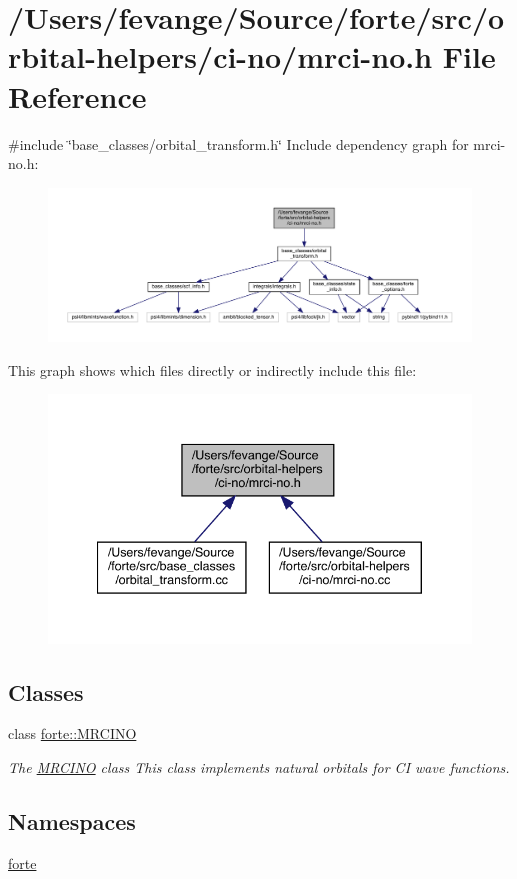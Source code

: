 \hypertarget{mrci-no_8h}{}\section{/\+Users/fevange/\+Source/forte/src/orbital-\/helpers/ci-\/no/mrci-\/no.h File Reference}
\label{mrci-no_8h}
{\ttfamily \#include \char`\"{}base\+\_\+classes/orbital\+\_\+transform.\+h\char`\"{}}\newline
Include dependency graph for mrci-\/no.h\+:
\nopagebreak
\begin{figure}[H]
\begin{center}
\leavevmode
\includegraphics[width=350pt]{mrci-no_8h__incl}
\end{center}
\end{figure}
This graph shows which files directly or indirectly include this file\+:
\nopagebreak
\begin{figure}[H]
\begin{center}
\leavevmode
\includegraphics[width=340pt]{mrci-no_8h__dep__incl}
\end{center}
\end{figure}
\subsection*{Classes}
\begin{DoxyCompactItemize}
\item 
class \mbox{\hyperlink{classforte_1_1_m_r_c_i_n_o}{forte\+::\+M\+R\+C\+I\+NO}}
\begin{DoxyCompactList}\small\item\em The \mbox{\hyperlink{classforte_1_1_m_r_c_i_n_o}{M\+R\+C\+I\+NO}} class This class implements natural orbitals for CI wave functions. \end{DoxyCompactList}\end{DoxyCompactItemize}
\subsection*{Namespaces}
\begin{DoxyCompactItemize}
\item 
 \mbox{\hyperlink{namespaceforte}{forte}}
\end{DoxyCompactItemize}
